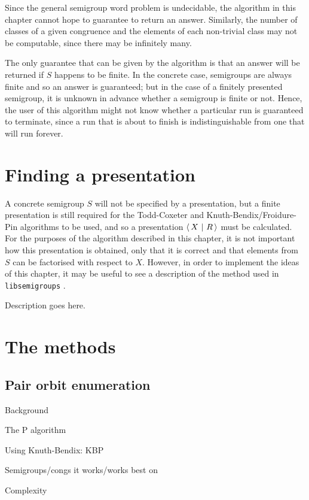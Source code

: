 Since the general semigroup word problem is undecidable, the algorithm in this
chapter cannot hope to guarantee to return an answer.  Similarly, the number of
classes of a given congruence and the elements of each non-trivial class may not
be computable, since there may be infinitely many.

The only guarantee that can be given by the algorithm is that an answer will be
returned if $S$ happens to be finite.  In the concrete case, semigroups are
always finite and so an answer is guaranteed; but in the case of a finitely
presented semigroup, it is unknown in advance whether a semigroup is finite or
not.  Hence, the user of this algorithm might not know whether a particular run
is guaranteed to terminate, since a run that is about to finish is
indistinguishable from one that will run forever.

\section{Finding a presentation}
\label{sec:find-pres}

A concrete semigroup $S$ will not be specified by a presentation, but a finite
presentation is still required for the Todd-Coxeter and
Knuth-Bendix/Froidure-Pin algorithms to be used, and so a presentation
$\left\langle\,X ~\middle|~ R\,\right\rangle$ must be calculated.  For the purposes of the algorithm described in
this chapter, it is not important how this presentation is obtained, only that
it is correct and that elements from $S$ can be factorised with respect to $X$.
However, in order to implement the ideas of this chapter, it may be useful to
see a description of the method used in \texttt{libsemigroups}
\cite{libsemigroups}.

Description goes here. %

\section{The methods}

\subsection{Pair orbit enumeration}
\label{sec:p}

Background

The P algorithm

Using Knuth-Bendix: KBP

Semigroups/congs it works/works best on

Complexity

